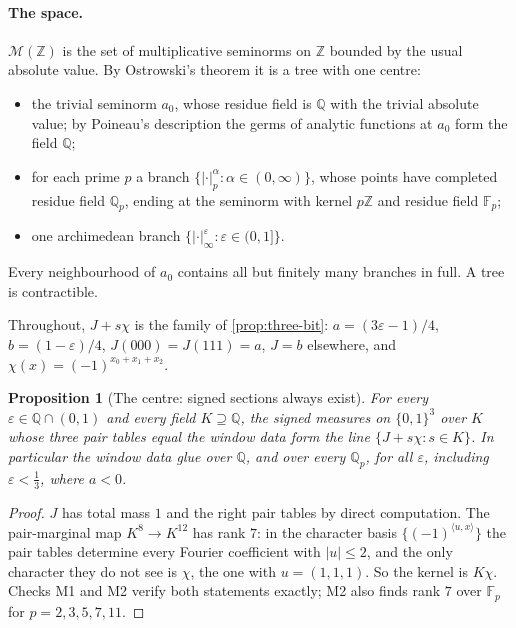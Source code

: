 \documentclass[11pt]{article}
\newtheorem{proposition}[theorem]{Proposition}
\theoremstyle{definition}
\begin{document}
\paragraph{The space.} $\mathcal{M}(\mathbb{Z})$ is the set of multiplicative seminorms on $\mathbb{Z}$ bounded by the usual absolute value.
By Ostrowski's theorem it is a tree with one centre:
\begin{itemize}
\item the trivial seminorm $a_0$, whose residue field is $\mathbb{Q}$ with the trivial absolute value; by Poineau's description the
  germs of analytic functions at $a_0$ form the field $\mathbb{Q}$;
\item for each prime $p$ a branch $\{|\cdot|_p^{\alpha}:\alpha\in(0,\infty)\}$, whose points have completed residue field
  $\mathbb{Q}_p$, ending at the seminorm with kernel $p\mathbb{Z}$ and residue field $\mathbb{F}_p$;
\item one archimedean branch $\{|\cdot|_\infty^{\varepsilon}:\varepsilon\in(0,1]\}$.
\end{itemize}
Every neighbourhood of $a_0$ contains all but finitely many branches in full. A tree is contractible.

Throughout, $J+s\chi$ is the family of \cref{prop:three-bit}: $a=(3\varepsilon-1)/4$, $b=(1-\varepsilon)/4$, $J(000)=J(111)=a$,
$J=b$ elsewhere, and $\chi(x)=(-1)^{x_0+x_1+x_2}$.

\begin{proposition}[The centre: signed sections always exist]\label{prop:places-centre}
For every $\varepsilon\in\mathbb{Q}\cap(0,1)$ and every field $K\supseteq\mathbb{Q}$, the signed measures on $\{0,1\}^3$ over $K$ whose
three pair tables equal the window data form the line $\{J+s\chi:s\in K\}$. In particular the window data glue over $\mathbb{Q}$, and
over every $\mathbb{Q}_p$, for all $\varepsilon$, including $\varepsilon<\tfrac13$, where $a<0$.
\end{proposition}
\begin{proof}
$J$ has total mass $1$ and the right pair tables by direct computation. The pair-marginal map $K^8\to K^{12}$ has rank $7$: in the
character basis $\{(-1)^{\langle u,x\rangle}\}$ the pair tables determine every Fourier coefficient with $|u|\leq2$, and the only
character they do not see is $\chi$, the one with $u=(1,1,1)$. So the kernel is $K\chi$. Checks M1 and M2 verify both statements
exactly; M2 also finds rank $7$ over $\mathbb{F}_p$ for $p=2,3,5,7,11$.
\end{proof}
\end{document}
